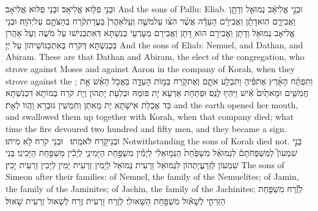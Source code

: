 {וּבְנֵ֥י פַלּ֖וּא אֱלִיאָֽב׃}
{וּבְנֵי פַלּוּא אֱלִיאָב׃}
{And the sons of Pallu: Eliab.}{}
{וּבְנֵ֣י אֱלִיאָ֔ב נְמוּאֵ֖ל וְדָתָ֣ן וַאֲבִירָ֑ם הֽוּא\maqqaf דָתָ֨ן וַאֲבִירָ֜ם  הָעֵדָ֗ה אֲשֶׁ֨ר הִצּ֜וּ עַל\maqqaf מֹשֶׁ֤ה וְעַֽל\maqqaf אַהֲרֹן֙ בַּעֲדַת\maqqaf קֹ֔רַח בְּהַצֹּתָ֖ם עַל\maqqaf יְהֹוָֽה׃}
{וּבְנֵי אֱלִיאָב נְמוּאֵל וְדָתָן וַאֲבִירָם הוּא דָּתָן וַאֲבִירָם מְעָרְעֵי כְּנִשְׁתָּא דְּאִתְכְּנִישׁוּ עַל מֹשֶׁה וְעַל אַהֲרֹן בִּכְנִשְׁתָּא דְּקֹרַח בְּאִתְכַּנּוֹשֵׁיהוֹן עַל יְיָ׃}
{And the sons of Eliab: Nemuel, and Dathan, and Abiram. These are that Dathan and Abiram, the elect of the congregation, who strove against Moses and against Aaron in the company of Korah, when they strove against the \lord;}{}
{וַתִּפְתַּ֨ח הָאָ֜רֶץ אֶת\maqqaf פִּ֗יהָ וַתִּבְלַ֥ע אֹתָ֛ם וְאֶת\maqqaf קֹ֖רַח בְּמ֣וֹת הָעֵדָ֑ה בַּאֲכֹ֣ל הָאֵ֗שׁ אֵ֣ת חֲמִשִּׁ֤ים וּמָאתַ֙יִם֙ אִ֔ישׁ וַיִּהְי֖וּ לְנֵֽס׃}
{וּפְתַחַת אַרְעָא יָת פּוּמַּהּ וּבְלַעַת יָתְהוֹן וְיָת קֹרַח בְּמוֹתָא דִּכְנִשְׁתָּא כַּד אֲכַלַת אִישָׁתָא יָת מָאתַן וְחַמְשִׁין גּוּבְרָא וַהֲווֹ לְאָת׃}
{and the earth opened her mouth, and swallowed them up together with Korah, when that company died; what time the fire devoured two hundred and fifty men, and they became a sign.}{}
{וּבְנֵי\maqqaf קֹ֖רַח לֹא\maqqaf מֵֽתוּ׃ \setuma }
{וּבְנֵי קֹרַח לָא מִיתוּ׃}
{Notwithstanding the sons of Korah died not.}{}
{בְּנֵ֣י שִׁמְעוֹן֮ לְמִשְׁפְּחֹתָם֒ לִנְמוּאֵ֗ל מִשְׁפַּ֙חַת֙ הַנְּמ֣וּאֵלִ֔י לְיָמִ֕ין מִשְׁפַּ֖חַת הַיָּמִינִ֑י לְיָכִ֕ין מִשְׁפַּ֖חַת הַיָּכִינִֽי׃}
{בְּנֵי שִׁמְעוֹן לְזַרְעֲיָתְהוֹן לִנְמוּאֵל זַרְעִית נְמוּאֵל לְיָמִין זַרְעִית יָמִין לְיָכִין זַרְעִית יָכִין׃}
{The sons of Simeon after their families: of Nemuel, the family of the Nemuelites; of Jamin, the family of the Jaminites; of Jachin, the family of the Jachinites;}{}
{לְזֶ֕רַח מִשְׁפַּ֖חַת הַזַּרְחִ֑י לְשָׁא֕וּל מִשְׁפַּ֖חַת הַשָּׁאוּלִֽי׃}
{לְזֶרַח זַרְעִית זֶרַח לְשָׁאוּל זַרְעִית שָׁאוּל׃}
